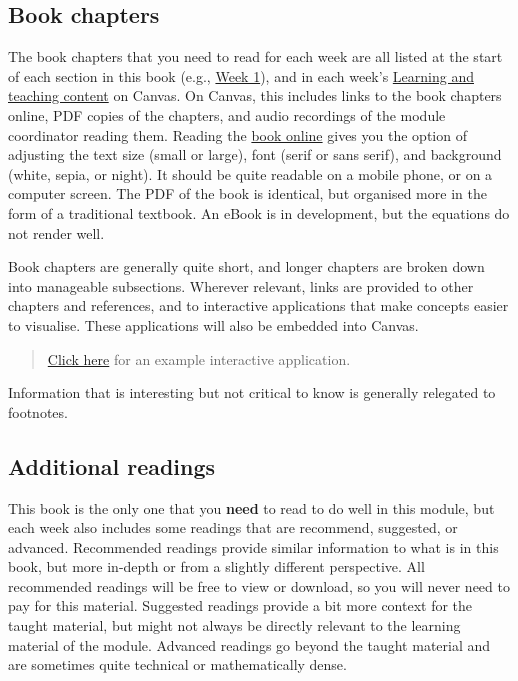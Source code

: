 \documentclass[
]{scrbook}
\begin{document}
\hypertarget{book_chapters}{%
\subsection*{Book chapters}\label{book_chapters}}

The book chapters that you need to read for each week are all listed at the start of each section in this book (e.g., \protect\hyperlink{Week1}{Week 1}), and in each week's \href{https://canvas.stir.ac.uk/courses/13075/pages/learning-and-teaching}{Learning and teaching content} on Canvas.
On Canvas, this includes links to the book chapters online, PDF copies of the chapters, and audio recordings of the module coordinator reading them.
Reading the \href{bradduthie.github.io/SCIU4T4/}{book online} gives you the option of adjusting the text size (small or large), font (serif or sans serif), and background (white, sepia, or night).
It should be quite readable on a mobile phone, or on a computer screen.
The PDF of the book is identical, but organised more in the form of a traditional textbook.
An eBook is in development, but the equations do not render well.

Book chapters are generally quite short, and longer chapters are broken down into manageable subsections.
Wherever relevant, links are provided to other chapters and references, and to interactive applications that make concepts easier to visualise.
These applications will also be embedded into Canvas.

\begin{quote}
\href{https://bradduthie.shinyapps.io/forest/}{Click here} for an example interactive application.
\end{quote}

Information that is interesting but not critical to know is generally relegated to footnotes.

\hypertarget{additional_readings}{%
\subsection*{Additional readings}\label{additional_readings}}

This book is the only one that you \textbf{need} to read to do well in this module, but each week also includes some readings that are recommend, suggested, or advanced.
Recommended readings provide similar information to what is in this book, but more in-depth or from a slightly different perspective.
All recommended readings will be free to view or download, so you will never need to pay for this material.
Suggested readings provide a bit more context for the taught material, but might not always be directly relevant to the learning material of the module.
Advanced readings go beyond the taught material and are sometimes quite technical or mathematically dense.
\end{document}
